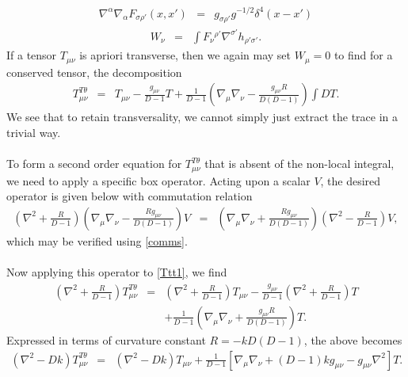 \documentclass[10pt,letterpaper]{article}
\numberwithin{equation}{section}
\begin{document}
\begin{appendices}
\begin{eqnarray}
\nabla^\alpha\nabla_\alpha F_{\sigma\rho'}(x,x') &=& g_{\sigma\rho'}g^{-1/2} \delta^4(x-x')
\end{eqnarray}
\begin{eqnarray}
W_\nu &=& \int F_\nu{}^{\rho'}\nabla^{\sigma'}h_{\rho'\sigma'}.
\end{eqnarray}
If a tensor $T_{\mu\nu}$ is apriori transverse, then we again may set $W_\mu =0$ to find for a conserved tensor, the decomposition
\begin{eqnarray}
T^{T\theta}_{\mu\nu} &=&  T_{\mu\nu} - \frac{g_{\mu\nu}}{D-1} T + \frac{1}{D-1}\left( \nabla_\mu\nabla_\nu - \frac{g_{\mu\nu}R}{D(D-1)}\right)\int D T.
\label{Ttt1}
\end{eqnarray}
We see that to retain transversality, we cannot simply just extract the trace in a trivial way.  
\\ \\
To form a second order equation for $T^{T\theta}_{\mu\nu}$ that is absent of the non-local integral, we need to apply a specific box operator. Acting upon a scalar $V$, the desired operator is given below with commutation relation
\begin{eqnarray}
\left( \nabla^2 + \frac{R}{D-1}\right) \left(\nabla_\mu\nabla_\nu - \frac{Rg_{\mu\nu}}{D(D-1)}\right)V &=& \left(\nabla_\mu\nabla_\nu + \frac{Rg_{\mu\nu}}{D(D-1)}\right)\left( \nabla^2 - \frac{R}{D-1}\right)V,
\end{eqnarray}
which may be verified using \eqref{comms}.
\\ \\
Now applying this operator to \eqref{Ttt1}, we find
\begin{eqnarray}
\left( \nabla^2 + \frac{R}{D-1}\right) T^{T\theta}_{\mu\nu} &=& \left( \nabla^2 + \frac{R}{D-1}\right) T_{\mu\nu} - \frac{g_{\mu\nu}}{D-1}\left( \nabla^2 + \frac{R}{D-1}\right)T
\nonumber\\
&&
+ \frac{1}{D-1}\left( \nabla_\mu\nabla_\nu + \frac{g_{\mu\nu}R}{D(D-1)}\right)T.
\end{eqnarray}
Expressed in terms of curvature constant $R = -kD(D-1)$, the above becomes
\begin{eqnarray}
(\nabla^2 -Dk)T^{T\theta}_{\mu\nu} &=& (\nabla^2 -Dk)T_{\mu\nu} +
\frac{1}{D-1}\left[ \nabla_\mu\nabla_\nu + (D-1)k g_{\mu\nu} - g_{\mu\nu}\nabla^2\right] T.
\label{Ttt2}
\end{eqnarray}
\end{appendices}
\end{document}
